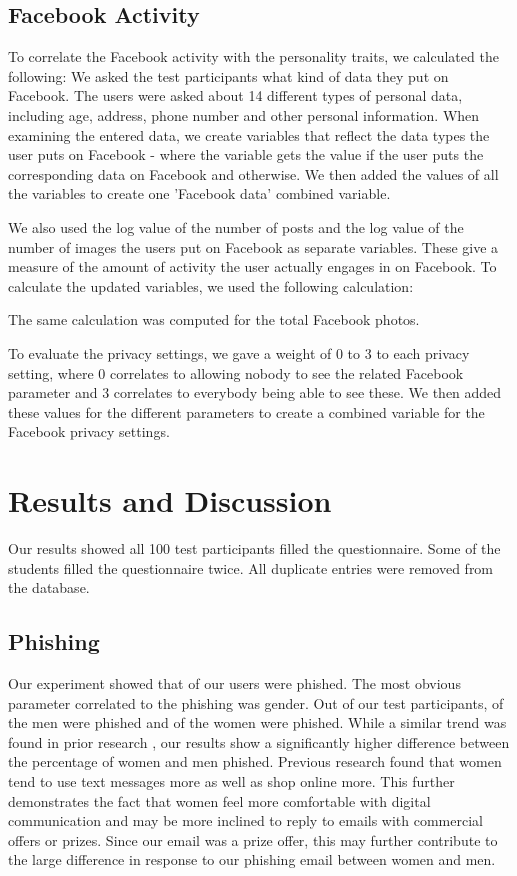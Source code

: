 \documentclass{sig-alternate}
\begin{document}
\subsection{Facebook Activity}


To correlate the Facebook activity with the personality traits, we calculated the following: We asked the test participants what kind of data they put on Facebook. The users were asked about 14 different types of personal data, including age, address,   phone number and other personal information.
When examining the entered data, we create variables that reflect the data types the user puts on Facebook - where the variable gets the value  if the user puts the corresponding data on Facebook and  otherwise. We then added the values of all the variables to create
one 'Facebook data' combined variable.

We also used the log value of the number of posts and the log value of the number of images the users put on Facebook as separate variables. These give a measure of the amount of activity the user actually engages in on Facebook. 
To calculate the updated variables, we used the following calculation:

The same calculation was computed for the total Facebook photos.

To evaluate the privacy settings, we gave a weight of 0 to 3 to each privacy setting, where 0 correlates to allowing nobody to see the related Facebook parameter and 3 correlates to everybody being able to see these. We then added these values for the different parameters to create a combined variable for the Facebook privacy settings.


\section{Results and Discussion}  
\label{sec:results}
Our results showed all 100 test participants filled the questionnaire. Some of the students filled the questionnaire twice. All duplicate entries were removed from the database. 


\subsection{Phishing}

Our experiment showed that  of our users were phished. The most obvious parameter correlated to the phishing was gender. Out of our test participants,  of the men were phished and  of the women were phished.
While a similar trend was found in prior research \cite {SHK10}, our results
show a significantly higher difference between the percentage of women and men phished.
Previous research \cite{SHOP} found that women tend to use text messages more as well as shop online more. This further demonstrates the fact that women feel more comfortable with digital communication and may be more inclined to reply to emails with commercial offers or prizes.
Since our email was a prize offer, this may further contribute to the large difference in response to our phishing email between women and men.
\end{document}

